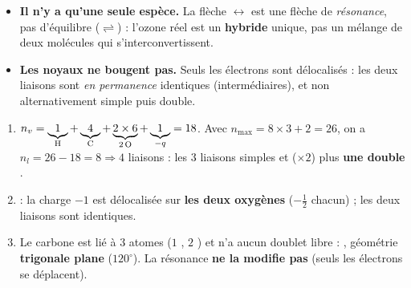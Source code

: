 \documentclass[11pt,a4paper]{article}
\begin{document}
\begin{corrige}
\begin{itemize}[leftmargin=1.4em,topsep=2pt,itemsep=2pt]
  \item \textbf{Il n'y a qu'une seule espèce.} La flèche $\leftrightarrow$ est une flèche de
        \emph{résonance}, pas d'équilibre ($\rightleftharpoons$) : l'ozone réel est un
        \textbf{hybride} unique, pas un mélange de deux molécules qui s'interconvertissent.
  \item \textbf{Les noyaux ne bougent pas.} Seuls les électrons sont délocalisés : les deux
        liaisons  sont \emph{en permanence} identiques (intermédiaires), et non
        alternativement simple puis double.
\end{itemize}
\end{corrige}

\begin{corrige}
\begin{enumerate}[label=\alph*)]
  \item $n_v = \underbrace{1}_{\ce{H}} + \underbrace{4}_{\ce{C}} + \underbrace{2\times 6}_{2\,\ce{O}}
        + \underbrace{1}_{-q} = 18$. Avec $n_{\max} = 8\times 3 + 2 = 26$, on a $n_l = 26-18 = 8
        \Rightarrow 4$ liaisons : les $3$ liaisons simples  et  ($\times 2$) plus
        \textbf{une double} . \checkmark
  \item {} : la charge $-1$ est délocalisée sur \textbf{les deux
        oxygènes} ($-\tfrac{1}{2}$ chacun) ; les deux liaisons  sont identiques.
  \item Le carbone est lié à $3$ atomes ($1$ , $2$ ) et n'a aucun doublet libre :
        , géométrie \textbf{trigonale plane} ($120^\circ$). La résonance \textbf{ne la
        modifie pas} (seuls les électrons se déplacent).
\end{enumerate}
\end{corrige}
\end{document}
